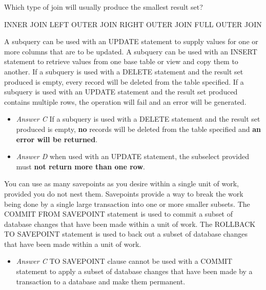 \documentclass[answers, 11pt]{exam}
\begin{document}
\begin{questions}
\question[1]
Which type of join will usually produce the smallest result set?
\begin{choices}
\CorrectChoice INNER JOIN
\choice LEFT OUTER JOIN
\choice RIGHT OUTER JOIN
\choice FULL OUTER JOIN
\end{choices}

\newpage
{}
\begin{choices}
\choice A subquery can be used with an UPDATE statement to supply values for one or more columns 
that are to be updated.
\choice A subquery can be used with an INSERT statement to retrieve values from one base table or view
and copy them to another.
\CorrectChoice If a subquery is used with a DELETE statement and the result set produced is empty, every record
will be deleted from the table specified.
\choice If a subquery is used with an UPDATE statement and the result set produced contains multiple rows,
the operation will fail and an error will be generated.
\end{choices}

\begin{solution}
\begin{itemize}
\item \textit{Answer C} If a subquery is used with a DELETE statement and the result set produced is
empty, \textbf{no} records will be deleted from the table specified and \textbf{an error will be
returned}.
\item \textit{Answer D} when used with an UPDATE statement, the subselect provided must \textbf{not
 return more than one row}.
\end{itemize}
\end{solution}


\begin{choices}
\choice You can use as many savepoints as you desire within a single unit of work, provided you do not
nest them.
\choice Savepoints provide a way to break the work being done by a single large transaction into one or
more smaller subsets.
\CorrectChoice The COMMIT FROM SAVEPOINT statement is used to commit a subset of database changes that have
been made within a unit of work.
\choice The ROLLBACK TO SAVEPOINT statement is used to back out a subset of database changes that have
been made within a unit of work.
\end{choices}

\begin{solution}
\begin{itemize}
\item \textit{Answer C} TO SAVEPOINT clause cannot be used with a COMMIT statement to apply a
subset of database changes that have been made by a transaction to a database and make them permanent.
\end{itemize}
\end{solution}


\end{questions}
\end{document}

